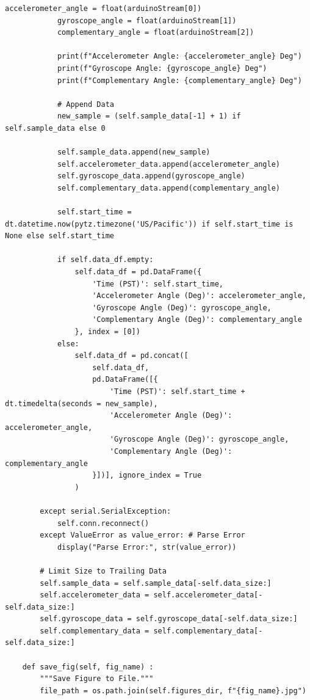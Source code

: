\documentclass{article}
\begin{document}
\begin{lstlisting}[caption={Source Code : Python Stripchart}, label={lst:stripchart_code}]
            accelerometer_angle = float(arduinoStream[0])
            gyroscope_angle = float(arduinoStream[1])
            complementary_angle = float(arduinoStream[2])

            print(f"Accelerometer Angle: {accelerometer_angle} Deg")
            print(f"Gyroscope Angle: {gyroscope_angle} Deg")
            print(f"Complementary Angle: {complementary_angle} Deg")

            # Append Data
            new_sample = (self.sample_data[-1] + 1) if self.sample_data else 0

            self.sample_data.append(new_sample)
            self.accelerometer_data.append(accelerometer_angle)
            self.gyroscope_data.append(gyroscope_angle)
            self.complementary_data.append(complementary_angle)

            self.start_time = dt.datetime.now(pytz.timezone('US/Pacific')) if self.start_time is None else self.start_time

            if self.data_df.empty:
                self.data_df = pd.DataFrame({
                    'Time (PST)': self.start_time,
                    'Accelerometer Angle (Deg)': accelerometer_angle,
                    'Gyroscope Angle (Deg)': gyroscope_angle,
                    'Complementary Angle (Deg)': complementary_angle
                }, index = [0])
            else:
                self.data_df = pd.concat([
                    self.data_df,
                    pd.DataFrame([{
                        'Time (PST)': self.start_time + dt.timedelta(seconds = new_sample),
                        'Accelerometer Angle (Deg)': accelerometer_angle,
                        'Gyroscope Angle (Deg)': gyroscope_angle,
                        'Complementary Angle (Deg)': complementary_angle
                    }])], ignore_index = True
                )

        except serial.SerialException:
            self.conn.reconnect()
        except ValueError as value_error: # Parse Error
            display("Parse Error:", str(value_error))

        # Limit Size to Trailing Data
        self.sample_data = self.sample_data[-self.data_size:]
        self.accelerometer_data = self.accelerometer_data[-self.data_size:]
        self.gyroscope_data = self.gyroscope_data[-self.data_size:]
        self.complementary_data = self.complementary_data[-self.data_size:]

    def save_fig(self, fig_name) :
        """Save Figure to File."""
        file_path = os.path.join(self.figures_dir, f"{fig_name}.jpg")


\end{lstlisting}
\end{document}
